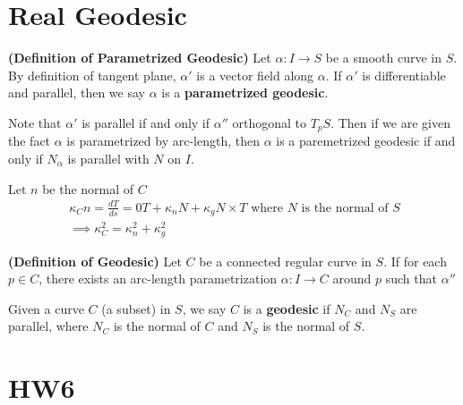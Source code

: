 \documentclass{report}
\begin{document}
\section{Real Geodesic}

\begin{definition}
\textbf{(Definition of Parametrized Geodesic)} Let $\alpha :I\rightarrow S$ be a smooth curve in $S$. By definition of tangent plane, $\alpha '$ is a vector field along $\alpha $. If $\alpha '$ is differentiable and parallel, then we say $\alpha $ is a \textbf{parametrized geodesic}. 
\end{definition}
\begin{mdframed}
Note that $\alpha '$ is parallel if and only if $\alpha ''$ orthogonal to $T_pS$. Then if we are given the fact $\alpha $ is parametrized by arc-length, then $\alpha $ is a paremetrized geodesic if and only if $N_\alpha$ is parallel with $N$ on $I$. 
\end{mdframed}
\begin{mdframed}
Let $n$ be the normal of $C$
\begin{align*}
&\kappa_C n=\frac{dT}{ds}=0T+ \kappa_n N + \kappa_g N\times T\text{ where $N$ is the normal of $S$ }\\
&\implies  \kappa_C^2 = \kappa_n ^2 + \kappa_g ^2
\end{align*}

\end{mdframed}
\begin{definition}
\textbf{(Definition of Geodesic)} Let $C$ be a connected regular curve in $S$.  If for each $p \in C$, there exists an arc-length parametrization $\alpha:I\rightarrow C$ around $p$  such that $\alpha ''$ 
\end{definition}
\begin{mdframed}
Given a curve $C$  (a subset) in $S$, we say  $C$ is a \textbf{geodesic} if $N_C$ and  $N_S$ are parallel, where  $N_C$ is the normal of  $C$ and  $N_S$ is the normal of  $S$. 
\end{mdframed}
\section{HW6}
\end{document}
